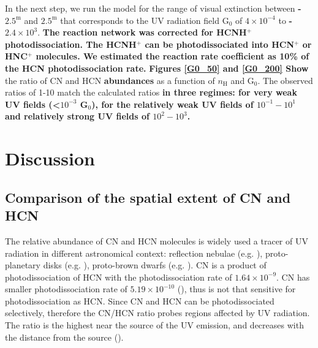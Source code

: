 \documentclass{aa}
\begin{document}
In the next step, we run the model for the
range of visual extinction between \textbf{-$2.5^{\mathrm{m}}$} and $2.5^{\mathrm{m}}$ that corresponds to
the UV radiation field G$_0$ of $4\times 10^{-4}$ to \textbf{-$2.4\times 10^{3}$}. \textbf{The reaction network was corrected for HCNH$^+$ photodissociation. The HCNH$^+$ can be photodissociated into HCN$^+$ or HNC$^+$ molecules. We estimated the reaction rate coefficient as 10\% of the HCN photodissociation rate.}
\textbf{Figures \ref{G0_50} and \ref{G0_200}
Show} the ratio of CN and HCN \textbf{abundances} as a function of $n_\mathrm{H}$ and G$_0$. The observed ratios 
of 1-10 match the calculated ratios \textbf{in three regimes: for very weak UV fields (<$10^{-3}$ G$_0$),  for the relatively weak UV fields of $10^{-1}-10^1$ and relatively strong UV fields of $10^{2}-10^3$.}

%
\section{Discussion}
\subsection{Comparison of the spatial extent of CN and HCN}
The relative abundance of CN and HCN molecules is widely used a tracer of UV radiation in different
astronomical context: reflection nebulae (e.g. \citealt{Fue95}), proto-planetary disks (e.g.
\citealt{Cha12}), proto-brown dwarfs (e.g. \citealt{Ria18}). CN is a product of photodissociation of
HCN with the photodissociation rate of $1.64\times10^{-9}$. CN has smaller photodissociation rate of
$5.19\times10^{-10}$ (\citealt{Hea17}), thus is not that sensitive for photodissociation as HCN.
Since CN and HCN can be photodissociated selectively, therefore the CN/HCN ratio probes regions
affected by UV radiation. The ratio is the highest near the source of the UV emission, and decreases
with the distance from the source (\citealt{Fue93}). 
\end{document}
